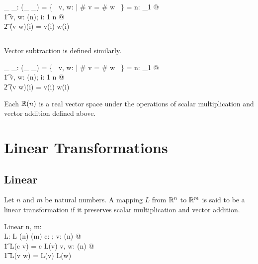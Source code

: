\documentclass[11pt, oneside]{article}
\begin{document}
\begin{axdef}
	\_ \vaddR \_: \Rinf \cross \Rinf \pfun \Rinf
\where
	\dom(\_ \vaddR \_) = \{~ v, w: \Rinf | \# v = \# w ~\}
\also
	\langle \rangle \vaddR \langle \rangle = \langle \rangle
\also
	\forall n: \nat_1 @ \\
	\t1	\forall v, w: \Rtuples(n); i: 1 \upto n @ \\
	\t2		(v \vaddR w)(i) = v(i) \addR w(i)
\end{axdef}

\subsection{}

Vector subtraction is defined similarly.

\begin{axdef}
	\_ \vsubR \_: \Rinf \cross \Rinf \pfun \Rinf
\where
	\dom(\_ \vsubR \_) = \{~ v, w: \Rinf | \# v = \# w ~\}
\also
	\langle \rangle \vsubR \langle \rangle = \langle \rangle
\also
	\forall n: \nat_1 @ \\
	\t1	\forall v, w: \Rtuples(n); i: 1 \upto n @ \\
	\t2		(v \vsubR w)(i) = v(i) \subR w(i)
\end{axdef}

Each $\mathbb{R}(n)$ is a real vector space under the operations of scalar multiplication and vector addition
defined above. 

\section{Linear Transformations}

\subsection{Linear}

Let $n$ and $m$ be natural numbers.
A mapping $L$ from $\mathbb{R}^n$ to $\mathbb{R}^m$ is said to be a linear transformation if it preserves scalar multiplication and vector addition.
\begin{schema}{Linear}
	n, m: \nat \\
	L: \Rinf \pfun \Rinf
\where
	L \in \Rtuples(n) \fun \Rtuples(m)
\also
	\forall c: \R; v: \Rtuples(n) @ \\
	\t1	L(c \smulR v) = c \smulR L(v)
\also
	\forall v, w: \Rtuples(n) @ \\
	\t1	L(v \vaddR w) = L(v) \vaddR L(w)
\end{schema}
\end{document}
